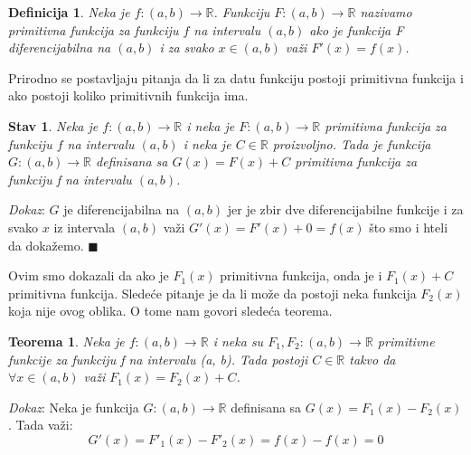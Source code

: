 \documentclass{article}
\newtheorem{definicija}{Definicija}[section]
\newtheorem{teorema}{Teorema}[section]
\newtheorem{stav}{Stav}[section]
\begin{document}
\begin{definicijabox}
    \begin{definicija}
        Neka je $f:(a, b) \longrightarrow \mathbb{R}$.
        Funkciju $F:(a, b) \longrightarrow \mathbb{R}$ nazivamo primitivna
        funkcija za funkciju $f$ na intervalu $(a, b)$ ako je funkcija F
        diferencijabilna na $(a, b)$ i za svako $x \in (a,b)$ važi
        $F'(x) = f(x)$.
    \end{definicija}
\end{definicijabox}
Prirodno se postavljaju pitanja da li za datu funkciju postoji
primitivna funkcija i ako postoji koliko primitivnih funkcija ima.
\begin{stavbox}
    \begin{stav}
        Neka je $f: (a, b) \longrightarrow \mathbb{R}$
        i neka je $F: (a,b) \longrightarrow \mathbb{R}$
        primitivna funkcija za funkciju $f$ na intervalu $(a, b)$
        i neka je $C \in \mathbb{R}$ proizvoljno. Tada je
        funkcija $G: (a, b) \longrightarrow \mathbb{R}$
        definisana sa $G(x) = F(x) + C$ primitivna funkcija za
        funkciju f na intervalu $(a, b)$.
    \end{stav}
\end{stavbox}
\textit{Dokaz}: $G$ je diferencijabilna na $(a, b)$ jer je zbir dve
diferencijabilne funkcije i za svako $x$ iz intervala $(a, b)$ važi $G'(x) = F'(x) + 0 = f(x)$
što smo i hteli da dokažemo.
\null\hfill $\blacksquare$ \par
Ovim smo dokazali da ako je $F_1(x)$ primitivna funkcija, onda
je i $F_1(x)+C$ primitivna funkcija. Sledeće pitanje je da li
može da postoji neka funkcija $F_2(x)$ koja nije ovog oblika.
O tome nam govori sledeća teorema.
\begin{teoremabox}
    \begin{teorema}
        Neka je $f: (a, b) \longrightarrow \mathbb{R}$ i
        neka su $F_1, F_2: (a,b) \longrightarrow \mathbb{R}$
        primitivne funkcije za funkciju f na intervalu (a, b).
        Tada postoji $C \in \mathbb{R}$ takvo da
        $\forall x \in (a, b)$ važi $F_1(x) = F_2(x) + C$.
    \end{teorema}
\end{teoremabox}

\textit{Dokaz}: Neka je funkcija $G: (a, b) \longrightarrow \mathbb{R}$
definisana sa $G(x) = F_1(x) - F_2(x)$. Tada važi:
\begin{equation*}
    G'(x) = F'_1(x) - F'_2(x) = f(x) - f(x) = 0
\end{equation*}
\end{document}
